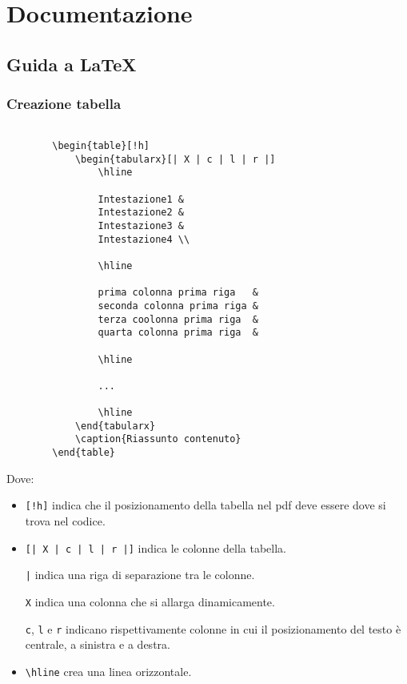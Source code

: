 \documentclass[a4paper, 12pt]{article}
\begin{document}
\tableofcontents

\newpage

\section{Documentazione}

\subsection{Guida a \LaTeX}
\label{subsec:gui}
\subsubsection{Creazione tabella}
\label{subsub:tab}
\begin{lstlisting}

        \begin{table}[!h]
            \begin{tabularx}[| X | c | l | r |]
                \hline

                Intestazione1 &
                Intestazione2 &
                Intestazione3 &
                Intestazione4 \\

                \hline

                prima colonna prima riga   &
                seconda colonna prima riga &
                terza coolonna prima riga  &
                quarta colonna prima riga  &

                \hline

                ...

                \hline
            \end{tabularx}
            \caption{Riassunto contenuto}
        \end{table}
\end{lstlisting}
Dove:
\begin{itemize}
    \item \lstinline+[!h]+ indica che il posizionamento della tabella nel pdf deve essere dove si trova nel codice.
    
    \item \lstinline+[| X | c | l | r |]+ indica le colonne della tabella.

    \lstinline+|+ indica una riga di separazione tra le colonne.

    \lstinline+X+ indica una colonna che si allarga dinamicamente.

    \lstinline+c+, \lstinline+l+ e \lstinline+r+ indicano rispettivamente colonne in cui il posizionamento del testo è centrale, a sinistra e a destra.

    \item \lstinline+\hline+ crea una linea orizzontale.
\end{itemize}
\end{document}
